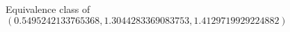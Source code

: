 \documentclass[preview]{standalone}
\begin{document}
\begin{center}
Equivalence class of $(0.5495242133765368, 1.3044283369083753, 1.4129719929224882)$
\end{center}
\end{document}
